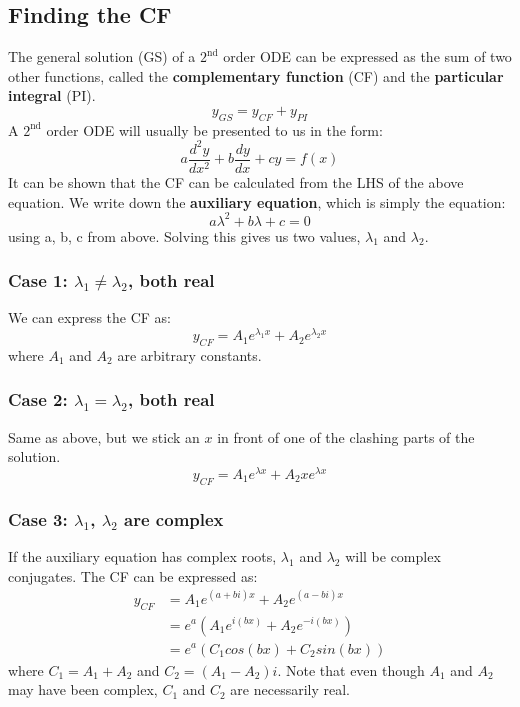 \documentclass{scrartcl}
\begin{document}
\subsection{Finding the CF}
The general solution (GS) of a $ 2^{\textrm{nd}} $ order ODE can be expressed as the sum of two other functions, called the \textbf{complementary function} (CF) and the \textbf{particular integral} (PI).
\begin{equation}
y_{GS} = y_{CF} + y_{PI}
\end{equation} 
A $ 2^{\textrm{nd}} $ order ODE will usually be presented to us in the form:
\begin{equation} \label{generalformdifferential}
a\frac{d^{2}y}{dx^{2}} + b\frac{dy}{dx} + cy = f(x)
\end{equation}
It can be shown that the CF can be calculated from the LHS of the above equation. We write down the \textbf{auxiliary equation}, which is simply the equation:
\begin{equation}
a\lambda^{2} + b\lambda + c = 0
\end{equation}
using a, b, c from above. Solving this gives us two values, $ \lambda_{1} $ and $ \lambda_{2} $.

\subsubsection*{Case 1: $ \lambda_{1} \neq \lambda_{2} $, both real}
We can express the CF as:
\begin{equation}
y_{CF} = A_{1}e^{\lambda_{1}x} + A_{2}e^{\lambda_{2}x}
\end{equation}
where $ A_{1} $ and $ A_{2} $ are arbitrary constants.

\subsubsection*{Case 2: $ \lambda_{1} = \lambda_{2} $, both real}
Same as above, but we stick an $ x $ in front of one of the clashing parts of the solution.
\begin{equation}
y_{CF} = A_{1}e^{\lambda x} + A_{2}xe^{\lambda x}
\end{equation}

\subsubsection*{Case 3: $ \lambda_{1} $, $ \lambda_{2} $ are complex}
If the auxiliary equation has complex roots, $ \lambda_{1} $ and $ \lambda_{2} $ will be complex conjugates. The CF can be expressed as:
\begin{equation}
\begin{split}
y_{CF} & = A_{1}e^{(a + bi)x} + A_{2}e^{(a - bi)x} \\
       & = e^{a}(A_{1}e^{i(bx)} + A_{2}e^{- i(bx)}) \\
       & = e^{a}(C_{1}cos(bx) + C_{2}sin(bx))
\end{split}
\end{equation}
where $ C_{1} = A_{1} + A_{2} $ and $ C_{2} = (A_{1} - A_{2})i $. Note that even though $ A_{1} $ and $ A_{2} $ may have been complex, $ C_{1} $ and $ C_{2} $ are necessarily real.
\end{document}
